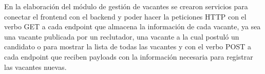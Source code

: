 En la elaboración del módulo de gestión de vacantes se crearon servicios para conectar el frontend con el backend y poder hacer la peticiones HTTP con el verbo GET a cada endpoint que almacena la información de cada vacante, ya sea una vacante publicada por un reclutador, una vacante a la cual postuló un candidato o para mostrar la lista de todas las vacantes y con el verbo POST a cada endpoint que reciben payloads con la información necesaria para registrar las vacantes nuevas. \\
\newline

